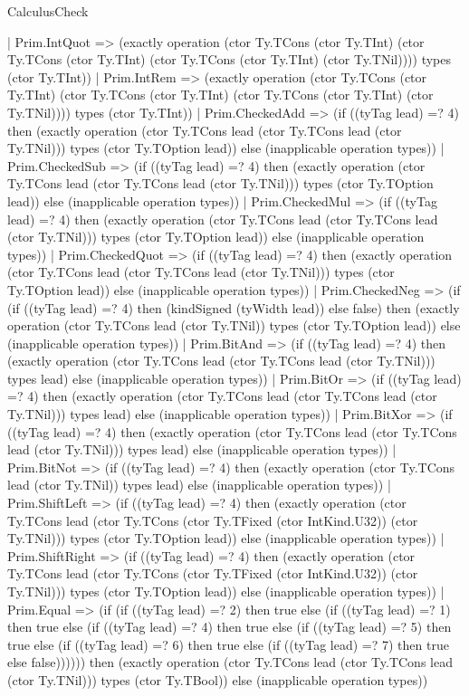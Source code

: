 \begin{lexlean}{CalculusCheck}
\begin{semanticmodule}
{    | Prim.IntQuot => (exactly operation (ctor Ty.TCons (ctor Ty.TInt) (ctor Ty.TCons (ctor Ty.TInt) (ctor Ty.TCons (ctor Ty.TInt) (ctor Ty.TNil)))) types (ctor Ty.TInt))
    | Prim.IntRem => (exactly operation (ctor Ty.TCons (ctor Ty.TInt) (ctor Ty.TCons (ctor Ty.TInt) (ctor Ty.TCons (ctor Ty.TInt) (ctor Ty.TNil)))) types (ctor Ty.TInt))
    | Prim.CheckedAdd => (if ((tyTag lead) =? 4) then (exactly operation (ctor Ty.TCons lead (ctor Ty.TCons lead (ctor Ty.TNil))) types (ctor Ty.TOption lead)) else (inapplicable operation types))
    | Prim.CheckedSub => (if ((tyTag lead) =? 4) then (exactly operation (ctor Ty.TCons lead (ctor Ty.TCons lead (ctor Ty.TNil))) types (ctor Ty.TOption lead)) else (inapplicable operation types))
    | Prim.CheckedMul => (if ((tyTag lead) =? 4) then (exactly operation (ctor Ty.TCons lead (ctor Ty.TCons lead (ctor Ty.TNil))) types (ctor Ty.TOption lead)) else (inapplicable operation types))
    | Prim.CheckedQuot => (if ((tyTag lead) =? 4) then (exactly operation (ctor Ty.TCons lead (ctor Ty.TCons lead (ctor Ty.TNil))) types (ctor Ty.TOption lead)) else (inapplicable operation types))
    | Prim.CheckedNeg => (if (if ((tyTag lead) =? 4) then (kindSigned (tyWidth lead)) else false) then (exactly operation (ctor Ty.TCons lead (ctor Ty.TNil)) types (ctor Ty.TOption lead)) else (inapplicable operation types))
    | Prim.BitAnd => (if ((tyTag lead) =? 4) then (exactly operation (ctor Ty.TCons lead (ctor Ty.TCons lead (ctor Ty.TNil))) types lead) else (inapplicable operation types))
    | Prim.BitOr => (if ((tyTag lead) =? 4) then (exactly operation (ctor Ty.TCons lead (ctor Ty.TCons lead (ctor Ty.TNil))) types lead) else (inapplicable operation types))
    | Prim.BitXor => (if ((tyTag lead) =? 4) then (exactly operation (ctor Ty.TCons lead (ctor Ty.TCons lead (ctor Ty.TNil))) types lead) else (inapplicable operation types))
    | Prim.BitNot => (if ((tyTag lead) =? 4) then (exactly operation (ctor Ty.TCons lead (ctor Ty.TNil)) types lead) else (inapplicable operation types))
    | Prim.ShiftLeft => (if ((tyTag lead) =? 4) then (exactly operation (ctor Ty.TCons lead (ctor Ty.TCons (ctor Ty.TFixed (ctor IntKind.U32)) (ctor Ty.TNil))) types (ctor Ty.TOption lead)) else (inapplicable operation types))
    | Prim.ShiftRight => (if ((tyTag lead) =? 4) then (exactly operation (ctor Ty.TCons lead (ctor Ty.TCons (ctor Ty.TFixed (ctor IntKind.U32)) (ctor Ty.TNil))) types (ctor Ty.TOption lead)) else (inapplicable operation types))
    | Prim.Equal => (if (if ((tyTag lead) =? 2) then true else (if ((tyTag lead) =? 1) then true else (if ((tyTag lead) =? 4) then true else (if ((tyTag lead) =? 5) then true else (if ((tyTag lead) =? 6) then true else (if ((tyTag lead) =? 7) then true else false)))))) then (exactly operation (ctor Ty.TCons lead (ctor Ty.TCons lead (ctor Ty.TNil))) types (ctor Ty.TBool)) else (inapplicable operation types))
}
\end{semanticmodule}
\end{lexlean}
